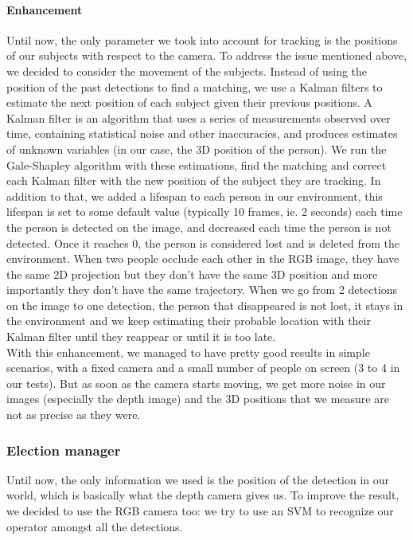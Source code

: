 \documentclass[a4paper, twocolumn]{article}
\begin{document}
    \paragraph{Enhancement} Until now, the only parameter we took into account for tracking is the positions of our subjects with respect to the camera. To address the issue mentioned above, we decided to consider the movement of the subjects. Instead of using the position of the past detections to find a matching, we use a Kalman filters to estimate the next position of each subject given their previous positions. A Kalman filter is an algorithm that uses a series of measurements observed over time, containing statistical noise and other inaccuracies, and produces estimates of unknown variables (in our case, the 3D position of the person). We run the Gale-Shapley algorithm with these estimations, find the matching and correct each Kalman filter with the new position of the subject they are tracking. In addition to that, we added a lifespan to each person in our environment, this lifespan is set to some default value (typically 10 frames, ie. 2 seconds) each time the person is detected on the image, and decreased each time the person is not detected. Once it reaches 0, the person is considered lost and is deleted from the environment. When two people occlude each other in the RGB image, they have the same 2D projection but they don't have the same 3D position and more importantly they don't have the same trajectory. When we go from 2 detections on the image to one detection, the person that disappeared is not lost, it stays in the environment and we keep estimating their probable location with their Kalman filter until they reappear or until it is too late.\\

    With this enhancement, we managed to have pretty good results in simple scenarios, with a fixed camera and a small number of people on screen (3 to 4 in our tests). But as soon as the camera starts moving, we get more noise in our images (especially the depth image) and the 3D positions that we measure are not as precise as they were.

    \subsubsection{Election manager}
    
    Until now, the only information we used is the position of the detection in our world, which is basically what the depth camera gives us. To improve the result, we decided to use the RGB camera too: we try to use an SVM to recognize our operator amongst all the detections.
    
\end{document}
